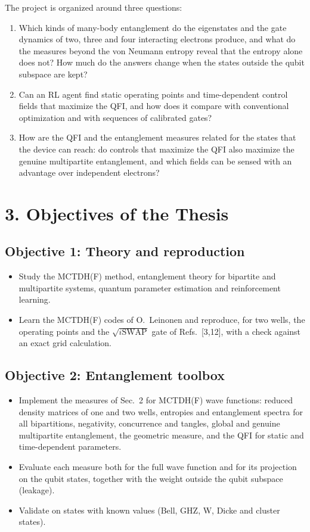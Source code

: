 \documentclass[12pt,a4paper]{article}
\begin{document}
The project is organized around three questions:
\begin{enumerate}
  \item Which kinds of many-body entanglement do the eigenstates and
  the gate dynamics of two, three and four interacting electrons
  produce, and what do the measures beyond the von Neumann entropy
  reveal that the entropy alone does not?  How much do the answers
  change when the states outside the qubit subspace are kept?
  \item Can an RL agent find static operating points and
  time-dependent control fields that maximize the QFI, and how does
  it compare with conventional optimization and with sequences of
  calibrated gates?
  \item How are the QFI and the entanglement measures related for
  the states that the device can reach: do controls that maximize
  the QFI also maximize the genuine multipartite entanglement, and
  which fields can be sensed with an advantage over independent
  electrons?
\end{enumerate}

\section*{3. Objectives of the Thesis}

\subsection*{Objective 1: Theory and reproduction}
\begin{itemize}
  \item Study the MCTDH(F) method, entanglement theory for bipartite
  and multipartite systems, quantum parameter estimation and
  reinforcement learning.
  \item Learn the MCTDH(F) codes of O.~Leinonen and reproduce, for two
  wells, the operating points and the $\sqrt{i\mathrm{SWAP}}$ gate of
  Refs.~[3,12], with a check against an exact grid calculation.
\end{itemize}

\subsection*{Objective 2: Entanglement toolbox}
\begin{itemize}
  \item Implement the measures of Sec.~2 for MCTDH(F) wave functions:
  reduced density matrices of one and two wells, entropies and
  entanglement spectra for all bipartitions, negativity, concurrence
  and tangles, global and genuine multipartite entanglement, the
  geometric measure, and the QFI for static and time-dependent
  parameters.
  \item Evaluate each measure both for the full wave function and
  for its projection on the qubit states, together with the weight
  outside the qubit subspace (leakage).
  \item Validate on states with known values (Bell, GHZ, W, Dicke
  and cluster states).
\end{itemize}
\end{document}
